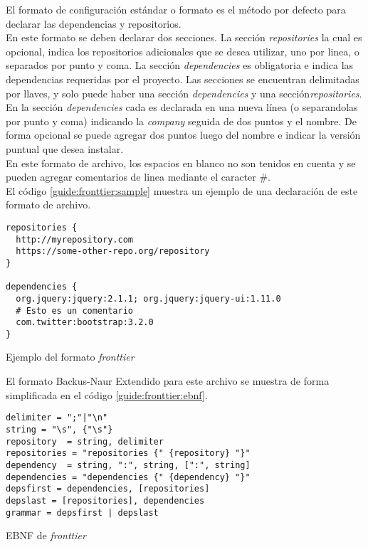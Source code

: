 El formato de configuración estándar o formato \fronttier es el método por 
defecto para declarar las dependencias y repositorios.\\
En este formato se deben declarar dos secciones. La sección \emph{repositories} 
la cual es opcional, indica los repositorios adicionales que se desea utilizar, 
uno por linea, o separados por punto y coma. La sección \emph{dependencies} es 
obligatoria e indica las dependencias requeridas por el proyecto. Las secciones 
se encuentran delimitadas por llaves, y solo puede haber una sección 
\emph{dependencies} y una sección\emph{repositories}.\\
En la sección \emph{dependencies} cada \dependency es declarada en una nueva 
línea (o separandolas por punto y coma) indicando la \emph{company} seguida de 
dos puntos y el nombre. De forma opcional se puede agregar dos puntos luego del 
nombre e indicar la versión puntual que desea instalar.\\
En este formato de archivo, los espacios en blanco no son tenidos en cuenta y 
se pueden agregar comentarios de linea mediante el caracter \#.\\
El código \ref{guide:fronttier:sample} muestra un ejemplo de una declaración de 
este formato de archivo.

\begin{listing}[ht]
\begin{verbatim}
repositories {
  http://myrepository.com
  https://some-other-repo.org/repository
}

dependencies {
  org.jquery:jquery:2.1.1; org.jquery:jquery-ui:1.11.0
  # Esto es un comentario
  com.twitter:bootstrap:3.2.0
}
\end{verbatim}
\caption{Ejemplo del formato \emph{fronttier}}
\label{guide:fronttier:sample}
\end{listing}
El formato Backus-Naur Extendido para este archivo se muestra de forma simplificada en 
el código \ref{guide:fronttier:ebnf}.

\begin{listing}[ht]
	\begin{verbatim}
delimiter = ";"|"\n"
string = "\s", {"\s"}
repository	= string, delimiter
repositories = "repositories {" {repository} "}"
dependency	= string, ":", string, [":", string]
dependencies = "dependencies {" {dependency} "}"
depsfirst = dependencies, [repositories]
depslast = [repositories], dependencies
grammar = depsfirst | depslast
	\end{verbatim}
	\caption{EBNF de \emph{fronttier}}
	\label{guide:fronttier:ebnf}
\end{listing}

